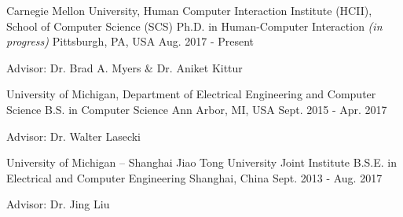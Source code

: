 

\begin{cventries}

  \cventry
    {Carnegie Mellon University, Human Computer Interaction Institute (HCII), School of Computer Science (SCS)} %
    {Ph.D. in Human-Computer Interaction \textit{(in progress)}} %
    {Pittsburgh, PA, USA} %
    {Aug. 2017 - Present} %
    {
      \begin{cvitems} %
        \item {Advisor: Dr. Brad A. Myers \& Dr. Aniket Kittur}
      \end{cvitems}
    }
  
  \cventry
    {University of Michigan, Department of Electrical Engineering and Computer Science} %
    {B.S. in Computer Science} %
    {Ann Arbor, MI, USA} %
    {Sept. 2015 - Apr. 2017} %
    {
      \begin{cvitems} %
        \item {Advisor: Dr. Walter Lasecki}
      \end{cvitems}
    }
  
  \cventry
    {University of Michigan – Shanghai Jiao Tong University Joint Institute} %
    {B.S.E. in Electrical and Computer Engineering} %
    {Shanghai, China} %
    {Sept. 2013 - Aug. 2017} %
    {
      \begin{cvitems} %
        \item {Advisor: Dr. Jing Liu}
      \end{cvitems}
    }

\end{cventries}
